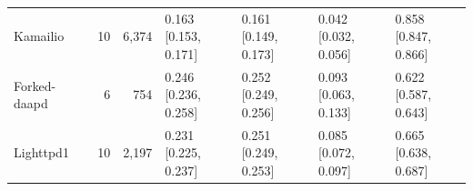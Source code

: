 \begin{table}[t]
\begin{tabularx}{\textwidth}{l r r *{4}{>{\centering\arraybackslash}X}}
Kamailio & 10 & 6,374 & \shortstack{0.163\\{[0.153, 0.171]}} & \shortstack{0.161\\{[0.149, 0.173]}} & \shortstack{0.042\\{[0.032, 0.056]}} & \shortstack{0.858\\{[0.847, 0.866]}} \\
Forked-daapd & 6 & 754 & \shortstack{0.246\\{[0.236, 0.258]}} & \shortstack{0.252\\{[0.249, 0.256]}} & \shortstack{0.093\\{[0.063, 0.133]}} & \shortstack{0.622\\{[0.587, 0.643]}} \\
Lighttpd1 & 10 & 2,197 & \shortstack{0.231\\{[0.225, 0.237]}} & \shortstack{0.251\\{[0.249, 0.253]}} & \shortstack{0.085\\{[0.072, 0.097]}} & \shortstack{0.665\\{[0.638, 0.687]}} \\
\bottomrule
\end{tabularx}
\end{table}
